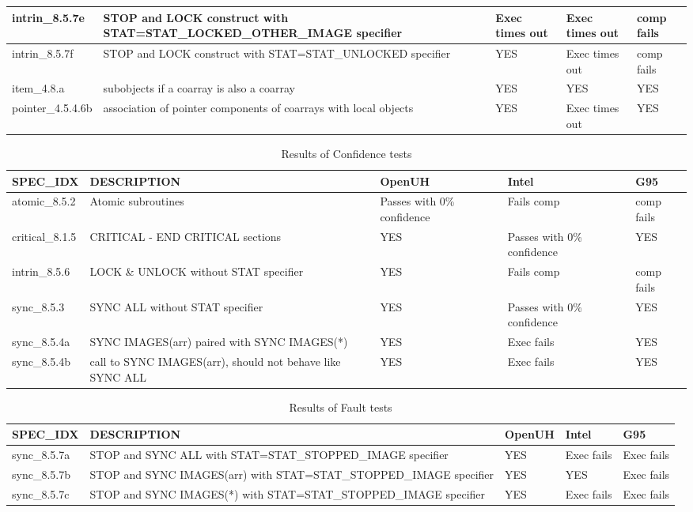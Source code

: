 \begin{table}[tbh!]
\begin{tabular}{|l|p{7cm}|p{1.5cm}|p{1.5cm}|p{1.5cm}|}
intrin\_8.5.7e         &  STOP and LOCK construct with STAT=STAT\_LOCKED\_OTHER\_IMAGE specifier & Exec times out & Exec times out & comp fails\\\hline
intrin\_8.5.7f         &  STOP and LOCK construct with STAT=STAT\_UNLOCKED specifier & YES & Exec times out & comp fails\\\hline
item\_4.8.a            &  subobjects if a coarray is also a coarray & YES & YES & YES\\\hline
pointer\_4.5.4.6b      &  association of pointer components of coarrays with local objects & YES & Exec times out & YES\\\hline
\end{tabular}
\end{table}

\begin{table}[tbh!]
\caption{Results of Confidence tests}
\label{tab:confidence}
\begin{tabular}{|l|p{6cm}|p{2cm}|p{2cm}|p{2cm}|}
\hline
SPEC\_IDX          &  DESCRIPTION  & OpenUH & Intel & G95 \\\hline
atomic\_8.5.2      &  Atomic subroutines & Passes with 0\% confidence & Fails comp & comp fails\\\hline
critical\_8.1.5    &  CRITICAL - END CRITICAL sections & YES & Passes with 0\% confidence & YES\\\hline
intrin\_8.5.6      &  LOCK \& UNLOCK without STAT specifier & YES & Fails comp & comp fails\\\hline
sync\_8.5.3        &  SYNC ALL without STAT specifier & YES & Passes with 0\% confidence & YES \\\hline
sync\_8.5.4a       &  SYNC IMAGES(arr) paired with SYNC IMAGES(*) & YES & Exec fails& YES \\\hline
sync\_8.5.4b       &  call to SYNC IMAGES(arr), should not behave like SYNC ALL & YES & Exec fails & YES \\\hline
\end{tabular}
\end{table}


\begin{table}[tbh!]
\caption{Results of Fault tests}
\label{tab:fault}
\begin{tabular}{|l|p{6cm}|p{2cm}|p{2cm}|p{2cm}|}
\hline
SPEC\_IDX          &      DESCRIPTION  & OpenUH & Intel & G95 \\\hline
sync\_8.5.7a       &      STOP and SYNC ALL with STAT=STAT\_STOPPED\_IMAGE specifier & YES & Exec fails & Exec fails \\\hline
sync\_8.5.7b       &      STOP and SYNC IMAGES(arr) with STAT=STAT\_STOPPED\_IMAGE specifier & YES & YES & Exec fails \\\hline
sync\_8.5.7c       &      STOP and SYNC IMAGES(*) with STAT=STAT\_STOPPED\_IMAGE specifier & YES & Exec fails & Exec fails \\\hline
\end{tabular}
\end{table}

